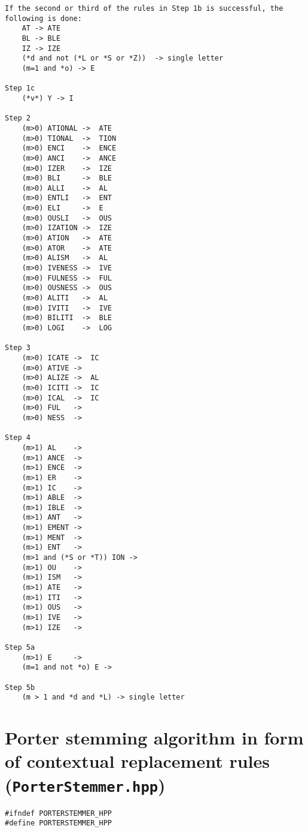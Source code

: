 \documentclass{article}
\begin{document}
\begin{appendices}
\begin{verbatim}
If the second or third of the rules in Step 1b is successful, the following is done:
	AT -> ATE                       
	BL -> BLE                       
	IZ -> IZE                       
	(*d and not (*L or *S or *Z))  -> single letter
	(m=1 and *o) -> E               

Step 1c
	(*v*) Y -> I                    

Step 2
	(m>0) ATIONAL ->  ATE           
	(m>0) TIONAL  ->  TION          
	(m>0) ENCI    ->  ENCE          
	(m>0) ANCI    ->  ANCE          
	(m>0) IZER    ->  IZE           
	(m>0) BLI     ->  BLE          
	(m>0) ALLI    ->  AL            
	(m>0) ENTLI   ->  ENT           
	(m>0) ELI     ->  E             
	(m>0) OUSLI   ->  OUS           
	(m>0) IZATION ->  IZE           
	(m>0) ATION   ->  ATE           
	(m>0) ATOR    ->  ATE           
	(m>0) ALISM   ->  AL            
	(m>0) IVENESS ->  IVE           
	(m>0) FULNESS ->  FUL           
	(m>0) OUSNESS ->  OUS           
	(m>0) ALITI   ->  AL            
	(m>0) IVITI   ->  IVE           
	(m>0) BILITI  ->  BLE        
	(m>0) LOGI    ->  LOG

Step 3
	(m>0) ICATE ->  IC              
	(m>0) ATIVE ->                  
	(m>0) ALIZE ->  AL              
	(m>0) ICITI ->  IC              
	(m>0) ICAL  ->  IC              
	(m>0) FUL   ->                  
	(m>0) NESS  ->                  

Step 4
	(m>1) AL    ->                  
	(m>1) ANCE  ->                  
	(m>1) ENCE  ->                  
	(m>1) ER    ->                  
	(m>1) IC    ->                  
	(m>1) ABLE  ->                  
	(m>1) IBLE  ->                  
	(m>1) ANT   ->                  
	(m>1) EMENT ->                  
	(m>1) MENT  ->                  
	(m>1) ENT   ->                  
	(m>1 and (*S or *T)) ION ->     
	(m>1) OU    ->                  
	(m>1) ISM   ->                  
	(m>1) ATE   ->                  
	(m>1) ITI   ->                  
	(m>1) OUS   ->                  
	(m>1) IVE   ->                  
	(m>1) IZE   ->                  

Step 5a
	(m>1) E     ->              
	(m=1 and not *o) E ->       

Step 5b
	(m > 1 and *d and *L) -> single letter
		\end{verbatim}
		\newpage
		\section{Porter stemming algorithm in form of contextual replacement rules (\texttt{PorterStemmer.hpp})}
		\label{appendix:PorterStemmer.hpp}
		\begin{verbatim}
#ifndef PORTERSTEMMER_HPP
#define PORTERSTEMMER_HPP


\end{verbatim}
\end{appendices}
\end{document}
